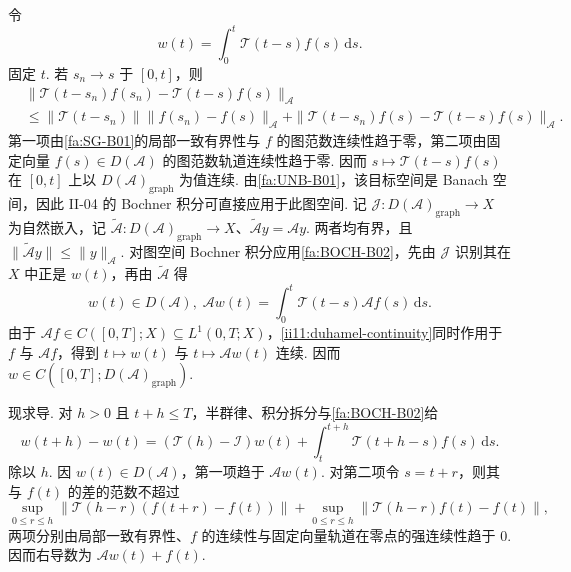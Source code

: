\begin{FAProof}
令
\[
w(t)
=
\int_0^t\mathcal T(t-s)f(s)\,\mathrm{d}s.
\]
固定 \(\displaystyle t\). 若 \(\displaystyle s_n\to s\) 于 \(\displaystyle[0,t]\)，则
\[
\begin{aligned}
&\|\mathcal T(t-s_n)f(s_n)-\mathcal T(t-s)f(s)\|_{\mathcal A}\\
&\leqslant
\|\mathcal T(t-s_n)\|\|f(s_n)-f(s)\|_{\mathcal A}
+
\|\mathcal T(t-s_n)f(s)-\mathcal T(t-s)f(s)\|_{\mathcal A}.
\end{aligned}
\]
第一项由\autoref{fa:SG-B01}的局部一致有界性与 \(\displaystyle f\) 的图范数连续性趋于零，第二项由固定向量 \(\displaystyle f(s)\in D(\mathcal A)\) 的图范数轨道连续性趋于零. 因而 \(\displaystyle s\mapsto\mathcal T(t-s)f(s)\) 在 \(\displaystyle[0,t]\) 上以 \(\displaystyle D(\mathcal A)_{\mathrm{graph}}\) 为值连续. 由\autoref{fa:UNB-B01}，该目标空间是 Banach 空间，因此 II-04 的 Bochner 积分可直接应用于此图空间. 记 \(\displaystyle\mathcal J:D(\mathcal A)_{\mathrm{graph}}\to X\) 为自然嵌入，记 \(\displaystyle\widetilde{\mathcal A}:D(\mathcal A)_{\mathrm{graph}}\to X\)、\(\displaystyle\widetilde{\mathcal A}y=\mathcal Ay\). 两者均有界，且 \(\displaystyle\|\widetilde{\mathcal A}y\|\leqslant\|y\|_{\mathcal A}\). 对图空间 Bochner 积分应用\autoref{fa:BOCH-B02}，先由 \(\displaystyle\mathcal J\) 识别其在 \(\displaystyle X\) 中正是 \(\displaystyle w(t)\)，再由 \(\displaystyle\widetilde{\mathcal A}\) 得
\[
w(t)\in D(\mathcal A),
\;
\mathcal Aw(t)
=
\int_0^t\mathcal T(t-s)\mathcal Af(s)\,\mathrm{d}s.
\]
由于 \(\displaystyle\mathcal Af\in C([0,T];X)\subseteq L^1(0,T;X)\)，\autoref{ii11:duhamel-continuity}同时作用于 \(\displaystyle f\) 与 \(\displaystyle\mathcal Af\)，得到 \(\displaystyle t\mapsto w(t)\) 与 \(\displaystyle t\mapsto\mathcal Aw(t)\) 连续. 因而 \(\displaystyle w\in C([0,T];D(\mathcal A)_{\mathrm{graph}})\).

现求导. 对 \(\displaystyle h>0\) 且 \(\displaystyle t+h\leqslant T\)，半群律、积分拆分与\autoref{fa:BOCH-B02}给
\[
w(t+h)-w(t)
=
(\mathcal T(h)-\mathcal I)w(t)
+
\int_t^{t+h}\mathcal T(t+h-s)f(s)\,\mathrm{d}s.
\]
除以 \(\displaystyle h\). 因 \(\displaystyle w(t)\in D(\mathcal A)\)，第一项趋于 \(\displaystyle\mathcal Aw(t)\). 对第二项令 \(\displaystyle s=t+r\)，则其与 \(\displaystyle f(t)\) 的差的范数不超过
\[
\sup_{0\leqslant r\leqslant h}
\|\mathcal T(h-r)(f(t+r)-f(t))\|
+
\sup_{0\leqslant r\leqslant h}
\|\mathcal T(h-r)f(t)-f(t)\|,
\]
两项分别由局部一致有界性、\(\displaystyle f\) 的连续性与固定向量轨道在零点的强连续性趋于 \(\displaystyle0\). 因而右导数为 \(\displaystyle\mathcal Aw(t)+f(t)\).


\end{FAProof}
